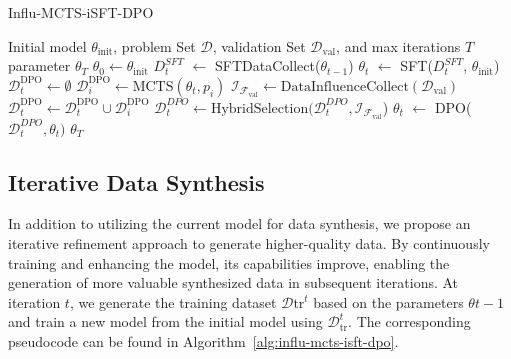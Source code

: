 {
\setlength{\textfloatsep}{0em}
\begin{algorithm}[t]
\caption{Influ-MCTS-iSFT-DPO}
\label{alg:influ-mcts-isft-dpo}
\begin{algorithmic}[1]
\REQUIRE Initial model $\theta_\text{init}$, problem Set $\mathcal{D}$, validation Set $\mathcal{D}_{\text{val}}$, and max iterations $T$
\ENSURE parameter $\theta_T$
\STATE $\theta_0 \gets \theta_\text{init}$
    \STATE $D_t^{SFT}$ $\gets$ SFTDataCollect($\theta_{t-1}$) 
    \STATE $\theta_t$ $\gets$ SFT($D_t^{SFT}$, $\theta_\text{init}$) 
    \STATE $\mathcal{D}_t^\text{DPO} \gets \emptyset$
        \STATE $\mathcal{D}_i^\text{DPO} \gets \text{MCTS}(\theta_t, p_i)$ 
        \STATE $\mathcal{I}_{\mathcal{F}_{\text{val}}}\gets \text{DataInfluenceCollect}(\mathcal{D}_{\text{val}})$ 
        \STATE $\mathcal{D}_t^\text{DPO} \gets \mathcal{D}_t^\text{DPO} \cup \mathcal{D}_i^\text{DPO}$
    \ENDFOR
    \STATE $\mathcal{D}_t^{DPO} \gets \text{HybridSelection}(\mathcal{D}_t^{DPO}, \mathcal{I}_{\mathcal{F}_{\text{val}}}$)
    \STATE $\theta_{t}$ $\gets$ DPO($\mathcal{D}_t^{DPO}, \theta_t)$
\ENDFOR
\OUTPUT $\theta_T$
\end{algorithmic}
\end{algorithm}
}

\subsection{Iterative Data Synthesis}
\label{subsection:iterative data synthesis}
In addition to utilizing the current model for data synthesis, we propose an iterative refinement approach to generate higher-quality data. By continuously training and enhancing the model, its capabilities improve, enabling the generation of more valuable synthesized data in subsequent iterations. At iteration $t$, we generate the training dataset $\mathcal{D}{\text{tr}}^t$ based on the parameters $\theta{t-1}$ and train a new model from the initial model using $\mathcal{D}_{\text{tr}}^t$. The corresponding pseudocode can be found in Algorithm~\ref{alg:influ-mcts-isft-dpo}.
